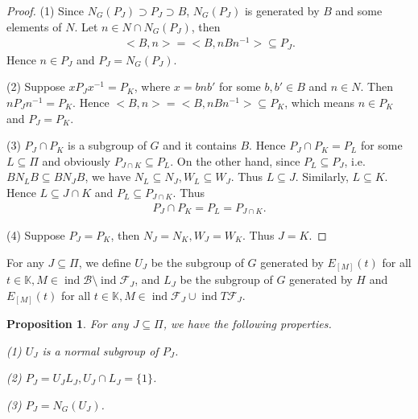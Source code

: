 \documentclass[12pt]{amsart}
\newtheorem{proposition}[theorem]{Proposition}
\begin{document}
\begin{proof}
    (1) Since $N_G(P_J) \supset P_J \supset B$, $N_G(P_J)$ is generated by $B$ and some elements of $N$.
    Let $n\in N\cap N_G(P_J)$, then 
    \begin{align*}
        <B,n> = <B,nBn^{-1}> \subseteq  P_J.
    \end{align*}
    Hence $n\in P_J$ and $P_J = N_G(P_J)$.

    (2) Suppose $xP_Jx^{-1} = P_K$, where $x=bnb'$ for some $b,b'\in B$ and $n\in N$.
    Then $nP_Jn^{-1} = P_K$.
    Hence $<B,n> = <B,nBn^{-1}> \subseteq  P_K$, which means $n\in P_K$ and $P_J=P_K$.

    (3) $P_J \cap P_K $ is a subgroup of $G$ and it contains $B$. 
    Hence $P_J \cap P_K = P_L$ for some $L\subseteq  \Pi$ and obviously $ P_{J\cap K} \subseteq  P_L$.
    On the other hand, since $P_L\subseteq  P_J$, i.e. $BN_LB\subseteq  BN_JB$, we have $N_L\subseteq  N_J, W_L \subseteq  W_J$.
    Thus $L\subseteq  J$.
    Similarly, $L\subseteq  K$. 
    Hence $L\subseteq  J\cap K$ and $P_L \subseteq  P_{J\cap K}$.
    Thus 
    \begin{align*}
        P_J \cap P_K = P_L = P_{J\cap K}.
    \end{align*}

    (4) Suppose $P_J=P_K$, then $N_J=N_K,W_J=W_K$. Thus $J=K$.
\end{proof}

For any $J\subseteq \Pi$, we define $U_J$ be the subgroup of $G$ generated by $E_{[M]}(t)$ for all $t\in \mathbb{K}, M\in \operatorname{ind}\mathcal{B}\setminus \operatorname{ind}\mathcal{F}_J$, 
and $L_J$ be the subgroup of $G$ generated by $H$ and $E_{[M]}(t)$ for all $t\in \mathbb{K}, M\in \operatorname{ind}\mathcal{F}_J \cup \operatorname{ind}T\mathcal{F}_J$.

\begin{proposition}
    For any $J\subseteq \Pi$, we have the following properties.

    (1) $U_J$ is a normal subgroup of $P_J$.

    (2) $P_J = U_J L_J, U_J \cap L_J = \{1\}$.

    (3) $P_J = N_G(U_J)$.

\end{proposition}
\end{document}
